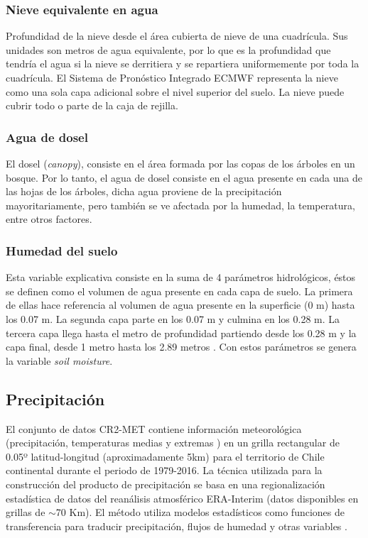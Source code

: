     \subsubsection{Nieve equivalente en agua}
    Profundidad de la nieve desde el área cubierta de nieve de una cuadrícula. Sus unidades son metros de agua equivalente, por lo que es la profundidad que tendría el agua si la nieve se derritiera y se 
    repartiera uniformemente por toda la cuadrícula. El Sistema de Pronóstico Integrado ECMWF representa la nieve como una sola capa adicional sobre el nivel superior del suelo. La nieve puede cubrir todo o parte de la caja de rejilla.

    \subsubsection{Agua de dosel}
    El dosel (\textit{canopy}), consiste en el área formada por las copas de los árboles en un bosque. Por lo tanto, el agua de dosel consiste en el agua presente en cada una de las hojas de los árboles, dicha agua proviene de 
    la precipitación mayoritariamente, pero también se ve afectada por la humedad, la temperatura, entre otros factores.

    \subsubsection{Humedad del suelo}
    Esta variable explicativa consiste en la suma de 4 parámetros hidrológicos, éstos se definen como el volumen de agua presente en cada capa de suelo. La primera de ellas
    hace referencia al volumen de agua presente en la superficie (0 m) hasta los 0.07 m. La segunda capa parte en los 0.07 m y culmina en los 0.28 m. La tercera capa llega hasta el metro de profundidad partiendo desde los 0.28 m
    y la capa final, desde 1 metro hasta los 2.89 metros \cite{ERA5-L_doc}. Con estos parámetros se genera la variable \textit{soil moisture}.

    \subsection{Precipitación}
    El conjunto de datos CR2-MET contiene información meteorológica (precipitación, temperaturas medias y extremas ) en un grilla rectangular de 0.05º latitud-longitud (aproximadamente 5km) para el territorio de Chile continental 
    durante el periodo de 1979-2016. La técnica utilizada para la construcción del producto de precipitación se basa en una regionalización estadística de datos del reanálisis atmosférico ERA-Interim (datos disponibles en grillas de $\sim$70 Km). 
    El método utiliza modelos estadísticos como funciones de transferencia para traducir precipitación, flujos de humedad y otras variables \cite{pr}.
    

